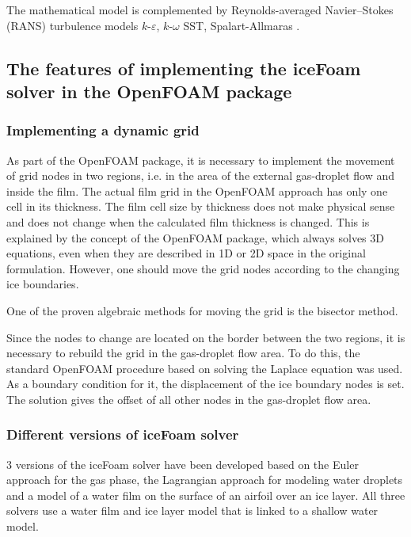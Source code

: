 \documentclass[aerospace,article,submit,moreauthors,pdftex]{Definitions/mdpi}
\begin{document}
The mathematical model is complemented by Reynolds-averaged Navier–Stokes (RANS) turbulence models $k\text{-}\varepsilon$, $k\text{-}\omega$ SST, Spalart-Allmaras \cite{wilcox2006turbulence}.

\subsection{The features of implementing the iceFoam solver in the OpenFOAM package 
\label{the-features-of-implementing-the-icefoam-solver-in-the-openfoam-package}}

\subsubsection{Implementing a dynamic grid}\label{implementing-a-dynamic-grid}

As part of the OpenFOAM package, it is necessary to implement the movement of grid nodes in two regions, i.e. in the area of the external gas-droplet flow and inside the film. The actual film grid in the OpenFOAM approach has only one cell in its thickness. The film cell size by thickness does not make physical sense and does not change when the calculated film thickness is changed. This is explained by the concept of the OpenFOAM package, which always solves 3D equations, even when they are described in 1D or 2D space in the original formulation. However, one should move the grid nodes according to the changing ice boundaries.

One of the proven algebraic methods for moving the grid is the bisector method. 

Since the nodes to change are located on the border between the two regions, it is necessary to rebuild the grid in the gas-droplet flow area. To do this, the standard OpenFOAM procedure based on solving the Laplace equation was used. As a boundary condition for it, the displacement of the ice boundary nodes is set. The solution gives the offset of all other nodes in the gas-droplet flow area.

\subsubsection{Different versions of iceFoam solver\label{sec:diff-icefoam-ver}}

3 versions of the iceFoam solver have been developed based on the Euler approach for the gas phase, the Lagrangian approach for modeling water droplets and a model of a water film on the surface of an airfoil over an ice layer. All three solvers use a water film and ice layer model that is linked to a shallow water model. 
\end{document}
